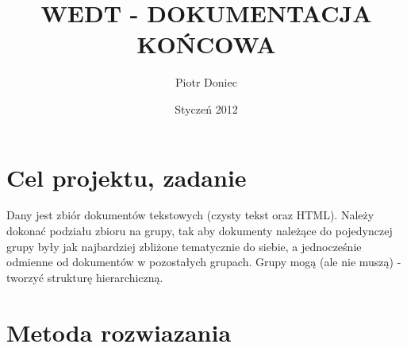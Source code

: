 \documentclass{article}
\begin{document}
\title{WEDT - DOKUMENTACJA KOŃCOWA}
\author{Piotr Doniec}
\date {Styczeń 2012}
\maketitle

\section{Cel projektu, zadanie}
Dany jest zbiór dokumentów tekstowych (czysty tekst oraz HTML). Należy dokonać podziału zbioru na grupy, tak aby dokumenty należące do pojedynczej grupy były jak najbardziej zbliżone tematycznie do siebie, a jednocześnie odmienne od dokumentów w pozostałych grupach. Grupy mogą (ale nie muszą) - tworzyć strukturę hierarchiczną. 

\section{Metoda rozwiazania}
\end{document}
